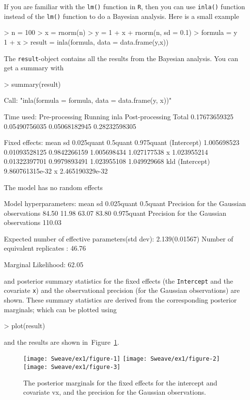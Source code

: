 \documentclass[a4paper,11pt]{report}
\newcommand{\tv}{\texttt}
\def\Fig#1{Figure~\ref{#1}}
\begin{document}
If you are familiar with the \verb|lm()| function in \tv{R}, then you
can use \verb|inla()| function instead of the \verb|lm()| function to
do a Bayesian analysis. Here is a small example
\begin{Schunk}
\begin{Sinput}
> n = 100
> x = rnorm(n)
> y = 1 + x + rnorm(n, sd = 0.1)
> formula = y ~ 1 + x
> result = inla(formula, data = data.frame(y,x))
\end{Sinput}
\end{Schunk}
The \verb|result|-object contains all the results from the Bayesian analysis.
You can get a summary with
\begin{Schunk}
\begin{Sinput}
> summary(result)
\end{Sinput}
\begin{Soutput}
Call:
"inla(formula = formula, data = data.frame(y, x))"

Time used:
 Pre-processing    Running inla Post-processing           Total 
  0.17673659325   0.05490756035   0.05068182945   0.28232598305 

Fixed effects:
                   mean            sd   0.025quant    0.5quant  0.975quant
(Intercept) 1.005698523 0.01093528125 0.9842266159 1.005698434 1.027177538
x           1.023955214 0.01322397701 0.9979893491 1.023955108 1.049929668
                        kld
(Intercept) 9.860761315e-32
x           2.465190329e-32

The model has no random effects

Model hyperparameters:
                                        mean   sd     0.025quant 0.5quant
Precision for the Gaussian observations  84.50  11.98  63.07      83.80  
                                        0.975quant
Precision for the Gaussian observations 110.03    

Expected number of effective parameters(std dev): 2.139(0.01567)
Number of equivalent replicates : 46.76 

Marginal Likelihood:  62.05 
\end{Soutput}
\end{Schunk}
and posterior summary statistics for the fixed effects (the
\tv{Intercept} and the covariate \tv{x}) and the observational
precision (for the Gaussian observations) are shown. These summary
statistics are derived from the corresponding posterior marginals;
which can be plotted using
\begin{Schunk}
\begin{Sinput}
> plot(result)
\end{Sinput}
\end{Schunk}
and the results are shown in~\Fig{fig:11}.
\begin{figure}[tbp]\centering\texttt{[image: Sweave/ex1/figure-1]}
\texttt{[image: Sweave/ex1/figure-2]}
\texttt{[image: Sweave/ex1/figure-3]}\caption{The posterior marginals for the fixed effects for the intercept and covariate 	v{x}, and the precision for the Gaussian observations.}\label{fig:11}\end{figure}
\end{document}
